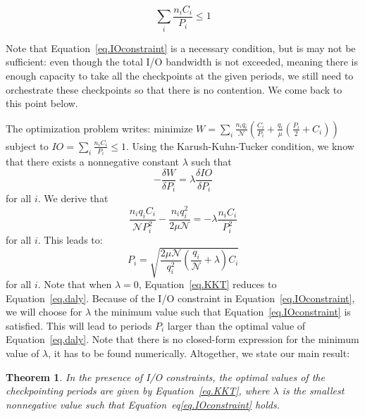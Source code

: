 \documentclass{article}
\newtheorem{theorem}{Theorem}
\newcommand{\nbnodesplat}{{\mathcal N}}
\newcommand{\nbapp}[1]{n_{#1}}
\newcommand{\nbnodes}[1]{q_{#1}}
\newcommand{\period}[1]{P_{#1}}
\newcommand{\ckpt}[1]{C_{#1}}
\newcommand{\mtbfplat}{\mu}
\newcommand{\wasteplat}{W}
\newcommand{\ioconstraint}{\mathit{IO}}
\begin{document}
\begin{equation}
\sum_{i} \frac{\nbapp{i} \ckpt{i}}{\period{i}} \leq 1
\label{eq.IOconstraint}
\end{equation}

Note that Equation~\eqref{eq.IOconstraint} is a necessary condition, but is may not be sufficient:
even though the total I/O bandwidth is not exceeded, meaning there is enough capacity to take all the checkpoints at the given periods, we still need to orchestrate these checkpoints so that there is no contention. We come back to this point below.

The optimization problem writes: minimize $\wasteplat = \sum_i \frac{\nbapp{i} \nbnodes{i}}{\nbnodesplat}  \left( \frac{\ckpt{i}}{\period{i}} +
\frac{\nbnodes{i}}{\mtbfplat}(\frac{\period{i}}{2} + \ckpt{i}) \right)$
subject to $\ioconstraint = \sum_{i} \frac{\nbapp{i} \ckpt{i}}{\period{i}} \leq 1$.
Using the Karush-Kuhn-Tucker condition, we know that there exists a nonnegative constant 
$\lambda$
such that 
$$- \frac{\delta \wasteplat}{\delta \period{i}} = \lambda \frac{\delta\ioconstraint }{\delta \period{i}}$$
for all $i$. We derive that 
$$\frac{\nbapp{i} \nbnodes{i} \ckpt{i}}{\nbnodesplat \period{i}^{2}} -    \frac{\nbapp{i} \nbnodes{i}^{2}}{2 \mtbfplat \nbnodesplat} = - \lambda \frac{\nbapp{i} \ckpt{i}}{\period{i}^{2}}
$$
for all $i$. This leads to:
 \begin{equation}
\period{i} = \sqrt{\frac{2 \mtbfplat  \nbnodesplat}{\nbnodes{i}^{2}} \left(\frac{\nbnodes{i}}{\nbnodesplat} +\lambda \right) \ckpt{i}}
  \label{eq.KKT}
\end{equation}
for all $i$. Note that when $\lambda=0$, Equation~\eqref{eq.KKT} reduces to Equation~\eqref{eq.daly}. Because of the I/O constraint in Equation~\eqref{eq.IOconstraint},
we will choose for $\lambda$ the minimum value such that Equation~\eqref{eq.IOconstraint}
  is satisfied. This will lead to periods $P_{i}$ larger than the optimal value of Equation~\eqref{eq.daly}. 
  Note that there is no closed-form expression for the minimum value of $\lambda$,
  it has to be found numerically.
   Altogether, we state our main result:
   
   \begin{theorem}
  In the presence of I/O constraints, the optimal values of the checkpointing periods are given
  by Equation~\eqref{eq.KKT}, where $\lambda$ is the smallest nonnegative value such that
  Equation~eq\ref{eq.IOconstraint} holds.
\end{theorem}
\end{document}
